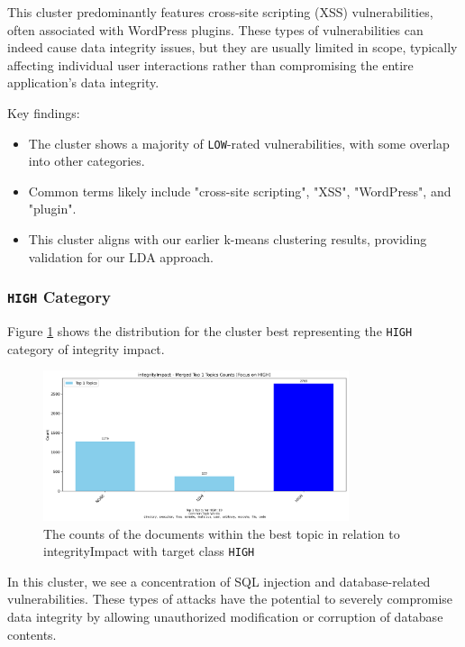 This cluster predominantly features cross-site scripting (XSS) vulnerabilities, often associated with WordPress plugins. These types of vulnerabilities can indeed cause data integrity issues, but they are usually limited in scope, typically affecting individual user interactions rather than compromising the entire application's data integrity.

Key findings:
\begin{itemize}
	\item The cluster shows a majority of \texttt{LOW}-rated vulnerabilities, with some overlap into other categories.
	\item Common terms likely include "cross-site scripting", "XSS", "WordPress", and "plugin".
	\item This cluster aligns with our earlier k-means clustering results, providing validation for our LDA approach.
\end{itemize}

\subsubsection{\texttt{HIGH} Category}
Figure \ref{fig:integrityImpact_20_HIGH} shows the distribution for the cluster best representing the \texttt{HIGH} category of integrity impact.

\begin{figure}[h]
	\centering
	\includegraphics[width=0.8\textwidth]{figures/integrityImpact/merged_top_k_topics_category_focus_counts_integrityImpact_HIGH_k1.png}
	\caption{The counts of the documents within the best topic in relation to integrityImpact with target class \texttt{HIGH}}
	\label{fig:integrityImpact_20_HIGH}
\end{figure}

In this cluster, we see a concentration of SQL injection and database-related vulnerabilities. These types of attacks have the potential to severely compromise data integrity by allowing unauthorized modification or corruption of database contents.

